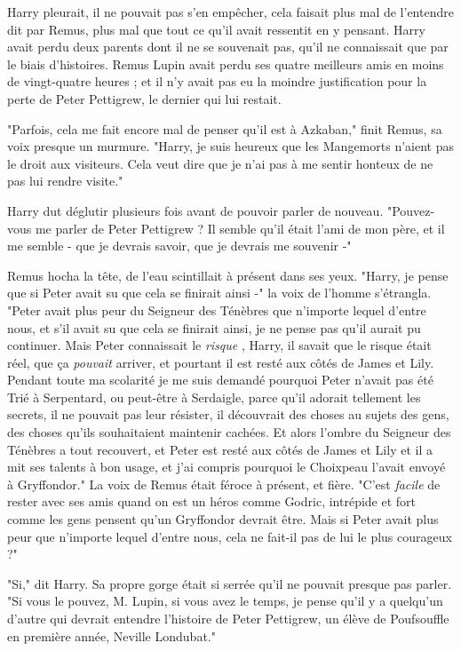 Harry pleurait, il ne pouvait pas s'en empêcher, cela faisait plus mal de l'entendre dit par Remus, plus mal que tout ce qu'il avait ressentit en y pensant. Harry avait perdu deux parents dont il ne se souvenait pas, qu'il ne connaissait que par le biais d'histoires. Remus Lupin avait perdu ses quatre meilleurs amis en moins de vingt-quatre heures ; et il n'y avait pas eu la moindre justification pour la perte de Peter Pettigrew, le dernier qui lui restait.

"Parfois, cela me fait encore mal de penser qu'il est à Azkaban," finit Remus, sa voix presque un murmure. "Harry, je suis heureux que les Mangemorts n'aient pas le droit aux visiteurs. Cela veut dire que je n'ai pas à me sentir honteux de ne pas lui rendre visite."

Harry dut déglutir plusieurs fois avant de pouvoir parler de nouveau. "Pouvez-vous me parler de Peter Pettigrew ? Il semble qu'il était l'ami de mon père, et il me semble - que je devrais savoir, que je devrais me souvenir -"

Remus hocha la tête, de l'eau scintillait à présent dans ses yeux. "Harry, je pense que si Peter avait su que cela se finirait ainsi -" la voix de l'homme s'étrangla. "Peter avait plus peur du Seigneur des Ténèbres que n'importe lequel d'entre nous, et s'il avait su que cela se finirait ainsi, je ne pense pas qu'il aurait pu continuer. Mais Peter connaissait le \emph{risque} , Harry, il savait que le risque était réel, que ça \emph{pouvait}  arriver, et pourtant il est resté aux côtés de James et Lily. Pendant toute ma scolarité je me suis demandé pourquoi Peter n'avait pas été Trié à Serpentard, ou peut-être à Serdaigle, parce qu'il adorait tellement les secrets, il ne pouvait pas leur résister, il découvrait des choses au sujets des gens, des choses qu'ils souhaitaient maintenir cachées. Et alors l'ombre du Seigneur des Ténèbres a tout recouvert, et Peter est resté aux côtés de James et Lily et il a mit ses talents à bon usage, et j'ai compris pourquoi le Choixpeau l'avait envoyé à Gryffondor." La voix de Remus était féroce à présent, et fière. "C'est \emph{facile}  de rester avec ses amis quand on est un héros comme Godric, intrépide et fort comme les gens pensent qu'un Gryffondor devrait être. Mais si Peter avait plus peur que n'importe lequel d'entre nous, cela ne fait-il pas de lui le plus courageux ?"

"Si," dit Harry. Sa propre gorge était si serrée qu'il ne pouvait presque pas parler. "Si vous le pouvez, M. Lupin, si vous avez le temps, je pense qu'il y a quelqu'un d'autre qui devrait entendre l'histoire de Peter Pettigrew, un élève de Poufsouffle en première année, Neville Londubat."

